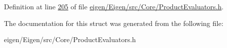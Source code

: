 Definition at line \hyperlink{eigen_2_eigen_2src_2_core_2_product_evaluators_8h_source_l00205}{205} of file \hyperlink{eigen_2_eigen_2src_2_core_2_product_evaluators_8h_source}{eigen/\+Eigen/src/\+Core/\+Product\+Evaluators.\+h}.



The documentation for this struct was generated from the following file\+:\begin{DoxyCompactItemize}
\item 
eigen/\+Eigen/src/\+Core/\+Product\+Evaluators.\+h\end{DoxyCompactItemize}

